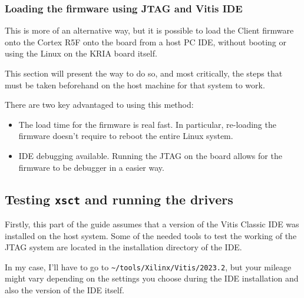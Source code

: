 \documentclass[10pt]{article}
\begin{document}
\clearpage
\subsubsection{Loading the firmware using JTAG and Vitis IDE}
\label{sec:org54f2c82}
This is more of an alternative way, but it is possible to load the Client
firmware onto the Cortex R5F onto the board from a host PC IDE, without booting or
using the Linux on the KRIA board itself.

This section will present the way to do so, and most critically, the steps that must
be taken beforehand on the host machine for that system to work.

There are two key advantaged to using this method:
\begin{itemize}
\item The load time for the firmware is real fast. In particular, re-loading the
firmware doesn't require to reboot the entire Linux system.
\item IDE debugging available. Running the JTAG on the board allows for the firmware
to be debugger in a easier way.
\end{itemize}

\subsection{Testing \texttt{xsct} and running the drivers}
\label{sec:org698c6fc}
Firstly, this part of the guide assumes that a version of the Vitis Classic IDE
was installed on the host system. Some of the needed tools to test the working of the JTAG
system are located in the installation directory of the IDE.

In my case, I'll have to go to \texttt{\textasciitilde{}/tools/Xilinx/Vitis/2023.2}, but your mileage might vary
depending on the settings you choose during the IDE installation and also the version of
the IDE itself.
\end{document}

